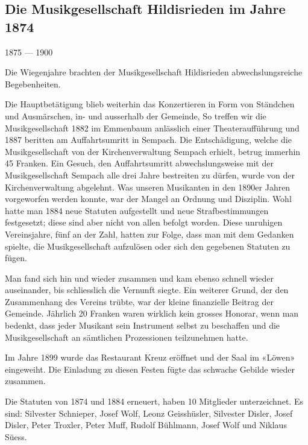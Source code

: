 \begin{multicols}{2}

    \section{Die Musikgesellschaft Hildisrieden im Jahre 1874}

    1875 — 1900

    Die Wiegenjahre brachten der Musikgesellschaft Hildisrieden abwechslungsreiche Begebenheiten.

    Die Hauptbetätigung blieb weiterhin das Konzertieren in Form von Ständchen und Ausmärschen,
    in- und ausserhalb der Gemeinde, So treffen wir die Musikgesellschaft
    1882 im Emmenbaum anlässlich einer Theateraufführung und 1887 beritten am Auffahrtsumritt in Sempach. Die Entschädigung,
    welche die Musikgesellschaft von der Kirchenverwaltung Sempach erhielt, betrug immerhin 45 Franken. Ein Gesuch, den
    Auffahrtsumritt abwechslungsweise mit der Musikgesellschaft Sempach alle drei Jahre bestreiten zu dürfen, wurde von der Kirchenverwaltung abgelehnt.
    Was unseren Musikanten in den 1890er Jahren vorgeworfen werden konnte,
    war der Mangel an Ordnung    und Disziplin. Wohl hatte man 1884 neue Statuten
    aufgestellt und neue Strafbestimmungen festgesetzt; diese sind aber nicht
    von allen befolgt worden. Diese unruhigen Vereinsjahre, fünf an der Zahl,
    hatten zur Folge, dass man mit dem Gedanken spielte, die Musikgesellschaft
    aufzulösen oder sich den gegebenen Statuten zu fügen.

    Man fand sich hin und wieder zusammen und kam
    ebenso schnell wieder auseinander, bis schliesslich die
    Vernunft siegte. Ein weiterer Grund, der den Zusammenhang des
    Vereins trübte, war der kleine finanzielle Beitrag der Gemeinde.
    Jährlich 20 Franken waren wirklich kein grosses Honorar, wenn man bedenkt,
    dass jeder Musikant sein Instrument selbst zu beschaffen und
    die Musikgesellschaft an sämtlichen Prozessionen teilzunehmen hatte.

    Im Jahre 1899 wurde das Restaurant Kreuz eröffnet und der Saal
    im «Löwen» eingeweiht. Die Einladung zu diesen Festen fügte das
    schwache Gebilde wieder zusammen.

    Die Statuten von 1874 und 1884 erneuert, haben 10
    Mitglieder unterzeichnet. Es sind: Silvester Schnieper,
    Josef Wolf, Leonz Geisshüsler, Silvester Disler, Josef
    Disler, Peter Troxler, Peter Muff, Rudolf Bühlmann,
    Josef Wolf und Niklaus Süess.


\end{multicols}
